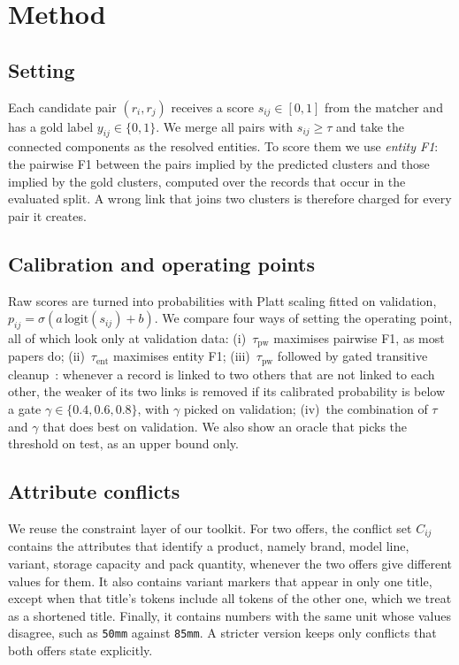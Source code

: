 \documentclass[conference]{IEEEtran}
\begin{document}
\section{Method}
\label{sec:method}

\subsection{Setting}
Each candidate pair $(r_i,r_j)$ receives a score $s_{ij}\in[0,1]$ from the matcher and has a gold label
$y_{ij}\in\{0,1\}$. We merge all pairs with $s_{ij}\ge\tau$ and take the connected components as the
resolved entities. To score them we use \emph{entity F1}: the pairwise F1 between the pairs implied by
the predicted clusters and those implied by the gold clusters, computed over the records that occur in
the evaluated split. A wrong link that joins two clusters is therefore charged for every pair it
creates.

\subsection{Calibration and operating points}
Raw scores are turned into probabilities with Platt scaling fitted on validation,
$p_{ij}=\sigma(a\,\mathrm{logit}(s_{ij})+b)$. We compare four ways of setting the operating point, all
of which look only at validation data:
(i)~$\tau_{\text{pw}}$ maximises pairwise F1, as most papers do;
(ii)~$\tau_{\text{ent}}$ maximises entity F1;
(iii)~$\tau_{\text{pw}}$ followed by gated transitive cleanup~\cite{dmeer2025transclean}: whenever a
record is linked to two others that are not linked to each other, the weaker of its two links is removed
if its calibrated probability is below a gate $\gamma\in\{0.4,0.6,0.8\}$, with $\gamma$ picked on
validation;
(iv)~the combination of $\tau$ and $\gamma$ that does best on validation.
We also show an oracle that picks the threshold on test, as an upper bound only.

\subsection{Attribute conflicts}
We reuse the constraint layer of our toolkit. For two offers, the conflict set $C_{ij}$ contains the
attributes that identify a product, namely brand, model line, variant, storage capacity and pack
quantity, whenever the two offers give different values for them. It also contains variant markers that appear in only one title, except when that title's tokens
include all tokens of the other one, which we treat as a shortened title. Finally, it contains numbers
with the same unit whose values disagree, such as \texttt{50mm} against \texttt{85mm}. A stricter version
keeps only conflicts that both offers state explicitly.
\end{document}
